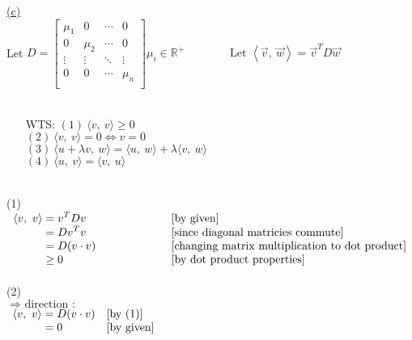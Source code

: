 \documentclass[12pt]{article}
\newcommand{\R}{\mathbb{R}}
\newcommand{\innerproduct}[2]{\left\langle #1, \ #2\right\rangle}
\begin{document}
\hyperlink{toc}{\hypertarget{5.3}{(c)}}\\
Let $\displaystyle D = \begin{bmatrix}
	\mu_1 & 0 & \cdots & 0 \\
	0 & \mu_2  & \cdots & 0 \\
	\vdots & \vdots & \ddots & \vdots \\
	0 & 0 & \cdots & \mu_n \\
\end{bmatrix} \mu_i \in \R^+ \qquad \qquad \text{Let }\innerproduct{\vec{v}}{\vec{w}} = \vec{v}^TD\vec{w}$
\\\\
\begin{itemize}[leftmargin=12mm]
	\item[WTS:] $(1)\ \langle v, \ v \rangle \geq 0 $\\
	      $(2)\ \langle v, \ v \rangle = 0  \iff  v = 0$\\
	      $(3)\ \langle u+\lambda v, \ w \rangle = \langle u, \ w \rangle + \lambda\langle v, \ w \rangle$\\
	      $(4)\ \langle u, \ v \rangle = \langle v, \ u \rangle $
\end{itemize}
\leavevmode\\
(1)\\ {$\begin{array}{r@{}>{\displaystyle}ll}
		\langle v, \ v \rangle & {}= v^T D v  & [\text{by given}]      \\
							   & {}= D v^T  v  & [\text{since diagonal matricies commute}]      \\
							   & {}= D (v\cdot v) \hspace*{20mm} & [\text{changing matrix multiplication to dot product}]      \\


		                       & {}\geq 0                  & [\text{by dot product properties}] \\
	\end{array}$}
\\\\ \newpage \noindent
(2)\\ $\Longrightarrow \text{ direction :}$\\{$\begin{array}{r@{}>{\displaystyle}ll}
		\langle v, \ v \rangle & {}= D (v\cdot v) & [\text{by (1)}] \\
		                       & {}= 0                     & [\text{by given}] \\
	\end{array}$}\\
\end{document}
